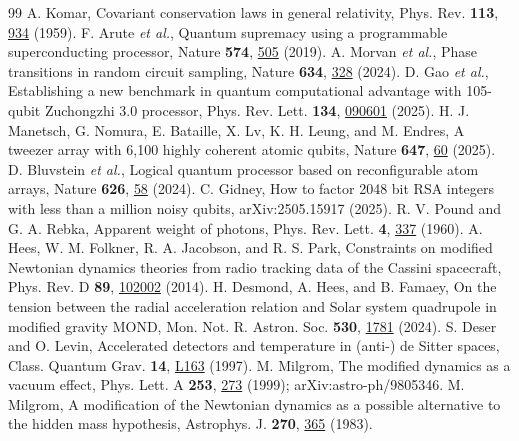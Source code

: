 \documentclass[aps,prd,twocolumn,superscriptaddress,nofootinbib,showkeys]{revtex4-2}
\begin{document}
\begin{thebibliography}{99}
 A. Komar, Covariant conservation laws in general relativity, Phys. Rev. \textbf{113}, \href{https://doi.org/10.1103/PhysRev.113.934}{934} (1959).
 F. Arute \emph{et al.}, Quantum supremacy using a programmable superconducting processor, Nature \textbf{574}, \href{https://doi.org/10.1038/s41586-019-1666-5}{505} (2019).
 A. Morvan \emph{et al.}, Phase transitions in random circuit sampling, Nature \textbf{634}, \href{https://doi.org/10.1038/s41586-024-07998-6}{328} (2024).
 D. Gao \emph{et al.}, Establishing a new benchmark in quantum computational advantage with 105-qubit Zuchongzhi 3.0 processor, Phys. Rev. Lett. \textbf{134}, \href{https://doi.org/10.1103/PhysRevLett.134.090601}{090601} (2025).
 H. J. Manetsch, G. Nomura, E. Bataille, X. Lv, K. H. Leung, and M. Endres, A tweezer array with 6,100 highly coherent atomic qubits, Nature \textbf{647}, \href{https://doi.org/10.1038/s41586-025-09641-4}{60} (2025).
 D. Bluvstein \emph{et al.}, Logical quantum processor based on reconfigurable atom arrays, Nature \textbf{626}, \href{https://doi.org/10.1038/s41586-023-06927-3}{58} (2024).
 C. Gidney, How to factor 2048 bit RSA integers with less than a million noisy qubits, arXiv:2505.15917 (2025).
 R. V. Pound and G. A. Rebka, Apparent weight of photons, Phys. Rev. Lett. \textbf{4}, \href{https://doi.org/10.1103/PhysRevLett.4.337}{337} (1960).
 A. Hees, W. M. Folkner, R. A. Jacobson, and R. S. Park, Constraints on modified Newtonian dynamics theories from radio tracking data of the Cassini spacecraft, Phys. Rev. D \textbf{89}, \href{https://doi.org/10.1103/PhysRevD.89.102002}{102002} (2014).
 H. Desmond, A. Hees, and B. Famaey, On the tension between the radial acceleration relation and Solar system quadrupole in modified gravity MOND, Mon. Not. R. Astron. Soc. \textbf{530}, \href{https://doi.org/10.1093/mnras/stae955}{1781} (2024).
 S. Deser and O. Levin, Accelerated detectors and temperature in (anti-) de Sitter spaces, Class. Quantum Grav. \textbf{14}, \href{https://doi.org/10.1088/0264-9381/14/9/003}{L163} (1997).
 M. Milgrom, The modified dynamics as a vacuum effect, Phys. Lett. A \textbf{253}, \href{https://doi.org/10.1016/S0375-9601(99)00077-8}{273} (1999); arXiv:astro-ph/9805346.
 M. Milgrom, A modification of the Newtonian dynamics as a possible alternative to the hidden mass hypothesis, Astrophys. J. \textbf{270}, \href{https://doi.org/10.1086/161130}{365} (1983).

\end{thebibliography}
\end{document}
